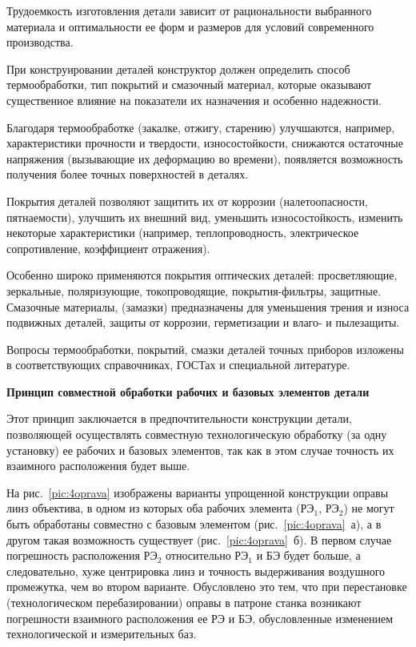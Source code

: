 Трудоемкость изготовления детали зависит от рациональности выбранного материала и оптимальности ее форм и размеров для условий современного производства. 

При конструировании деталей конструктор должен определить способ термообработки, тип покрытий и смазочный материал, которые оказывают существенное влияние на показатели их назначения и особенно надежности.

Благодаря термообработке (закалке, отжигу, старению) улучшаются, например, характеристики прочности и твердости, износостойкости, снижаются остаточные напряжения (вызывающие их деформацию во времени), появляется возможность получения более точных поверхностей в деталях.

Покрытия деталей позволяют защитить их от коррозии (налетоопасности, пятнаемости), улучшить их внешний вид, уменьшить износостойкость, изменить некоторые характеристики (например, теплопроводность, электрическое сопротивление, коэффициент отражения).

Особенно широко применяются покрытия оптических деталей: просветляющие, зеркальные, поляризующие, токопроводящие, покрытия-фильтры, защитные.
Смазочные материалы, (замазки) предназначены для уменьшения трения и износа подвижных деталей, защиты от коррозии, герметизации и влаго- и пылезащиты.

Вопросы термообработки, покрытий, смазки деталей точных приборов изложены в соответствующих справочниках, ГОСТах и специальной литературе.

\begin{flushleft}
\textbf{Принцип совместной обработки рабочих и базовых элементов детали}
\end{flushleft}

Этот принцип заключается в предпочтительности конструкции детали, позволяющей осуществлять совместную технологическую обработку (за одну установку) ее рабочих и базовых элементов, так как в этом случае точность их взаимного расположения будет выше.

На рис.~\ref{pic:4oprava} изображены варианты упрощенной конструкции оправы линз объектива, в одном из которых оба рабочих элемента (РЭ$ _1 $, РЭ$ _2 $) не могут быть обработаны совместно с базовым элементом (рис.~\ref{pic:4oprava}~а), а в другом такая возможность существует (рис.~\ref{pic:4oprava}~б). В первом случае погрешность расположения РЭ$ _2 $ относительно РЭ$ _1 $ и БЭ будет больше, а следовательно, хуже центрировка линз и точность выдерживания воздушного промежутка, чем во втором варианте. Обусловлено это тем, что при перестановке (технологическом перебазировании) оправы в патроне станка возникают погрешности взаимного расположения ее РЭ и БЭ, обусловленные изменением технологической и измерительных баз.

